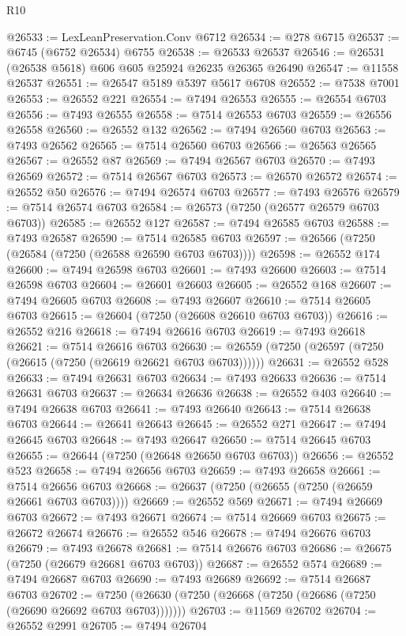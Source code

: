 \begin{lexlean}{R10}
\begin{coremodule}
@26533 := LexLeanPreservation.Conv @6712
@26534 := @278 @6715
@26537 := @6745 (@6752 @26534) @6755
@26538 := @26533 @26537
@26546 := @26531 (@26538 @5618) @606 @605 @25924 @26235 @26365 @26490
@26547 := @11558 @26537
@26551 := @26547 @5189 @5397 @5617 @6708
@26552 := @7538 @7001
@26553 := @26552 @221
@26554 := @7494 @26553
@26555 := @26554 @6703
@26556 := @7493 @26555
@26558 := @7514 @26553 @6703
@26559 := @26556 @26558
@26560 := @26552 @132
@26562 := @7494 @26560 @6703
@26563 := @7493 @26562
@26565 := @7514 @26560 @6703
@26566 := @26563 @26565
@26567 := @26552 @87
@26569 := @7494 @26567 @6703
@26570 := @7493 @26569
@26572 := @7514 @26567 @6703
@26573 := @26570 @26572
@26574 := @26552 @50
@26576 := @7494 @26574 @6703
@26577 := @7493 @26576
@26579 := @7514 @26574 @6703
@26584 := @26573 (@7250 (@26577 @26579 @6703 @6703))
@26585 := @26552 @127
@26587 := @7494 @26585 @6703
@26588 := @7493 @26587
@26590 := @7514 @26585 @6703
@26597 := @26566 (@7250 (@26584 (@7250 (@26588 @26590 @6703 @6703))))
@26598 := @26552 @174
@26600 := @7494 @26598 @6703
@26601 := @7493 @26600
@26603 := @7514 @26598 @6703
@26604 := @26601 @26603
@26605 := @26552 @168
@26607 := @7494 @26605 @6703
@26608 := @7493 @26607
@26610 := @7514 @26605 @6703
@26615 := @26604 (@7250 (@26608 @26610 @6703 @6703))
@26616 := @26552 @216
@26618 := @7494 @26616 @6703
@26619 := @7493 @26618
@26621 := @7514 @26616 @6703
@26630 := @26559 (@7250 (@26597 (@7250 (@26615 (@7250 (@26619 @26621 @6703 @6703))))))
@26631 := @26552 @528
@26633 := @7494 @26631 @6703
@26634 := @7493 @26633
@26636 := @7514 @26631 @6703
@26637 := @26634 @26636
@26638 := @26552 @403
@26640 := @7494 @26638 @6703
@26641 := @7493 @26640
@26643 := @7514 @26638 @6703
@26644 := @26641 @26643
@26645 := @26552 @271
@26647 := @7494 @26645 @6703
@26648 := @7493 @26647
@26650 := @7514 @26645 @6703
@26655 := @26644 (@7250 (@26648 @26650 @6703 @6703))
@26656 := @26552 @523
@26658 := @7494 @26656 @6703
@26659 := @7493 @26658
@26661 := @7514 @26656 @6703
@26668 := @26637 (@7250 (@26655 (@7250 (@26659 @26661 @6703 @6703))))
@26669 := @26552 @569
@26671 := @7494 @26669 @6703
@26672 := @7493 @26671
@26674 := @7514 @26669 @6703
@26675 := @26672 @26674
@26676 := @26552 @546
@26678 := @7494 @26676 @6703
@26679 := @7493 @26678
@26681 := @7514 @26676 @6703
@26686 := @26675 (@7250 (@26679 @26681 @6703 @6703))
@26687 := @26552 @574
@26689 := @7494 @26687 @6703
@26690 := @7493 @26689
@26692 := @7514 @26687 @6703
@26702 := @7250 (@26630 (@7250 (@26668 (@7250 (@26686 (@7250 (@26690 @26692 @6703 @6703)))))))
@26703 := @11569 @26702
@26704 := @26552 @2991
@26705 := @7494 @26704

\end{coremodule}
\end{lexlean}
